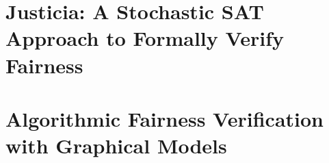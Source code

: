 \documentclass{report}
\makeatletter
\newcommand\backmatter{%
	\if@openright
	\cleardoublepage
	\else
	\clearpage
	\fi
}
\makeatother
\begin{document}
%	
		

			\chapter{Justicia: A Stochastic SAT Approach to Formally Verify Fairness}
%				
				
%				
				
				
				
				
%				
%				
			\chapter{Algorithmic Fairness Verification with Graphical Models}
%				
				
%				
				
				
				
				
				
%				
%				
%				
%				
%				
%				
%					
			
		
	\backmatter				 
	
	
%	
		
	
\end{document}

